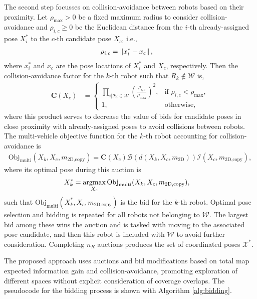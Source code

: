 The second step focusses on collision-avoidance between robots based on their proximity. Let $\rho_\text{max}>0$ be a fixed maximum radius to consider collision-avoidance and $\rho_{i,c}\geq0$ be the Euclidean distance from the $i$-th already-assigned pose $X^*_i$ to the $c$-th candidate pose $X_c$, i.e.,
\begin{align}
\rho_{i,c}&=\left\| x^*_i-x_c \right\|,
\end{align}
where $x^*_i$ and $x_c$ are the pose locations of $X^*_i$ and $X_c$, respectively. Then the collision-avoidance factor for the $k$-th robot such that $R_k\notin\mathcal W$ is,
\begin{align}
\label{eqn:CollisionAvoidanceAmongRobots}
\mathbf C(X_c)&=
\begin{cases}
    \prod_{i|\mathcal{R}_i\in\mathcal W} \left(\frac{\rho_{i,c}}{\rho_\text{max}}\right)^2,		& \text{if }\rho_{i,c}<\rho_\text{max},\\
    1,              				& \text{otherwise},
\end{cases}
\end{align}
where this product serves to decrease the value of bids for candidate poses in close proximity with already-assigned poses to avoid collisions between robots. The multi-vehicle objective function for the $k$-th robot accounting for collision-avoidance is
\begin{align}
\label{eqn:CandidateBidMulti}
\text{Obj}_\text{multi}(X_k,X_c,m_\text{2D,copy})
=\mathbf C(X_c)\mathcal B(d(X_k,X_c,m_\text{2D}))\mathcal I(X_{c},m_\text{2D,copy}),
\end{align}
where its optimal pose during this auction is
\begin{align}
\label{eqn:OptPoseMulti}
X^*_{k}=\argmax_{X_c}\text{Obj}_\text{multi}&(X_k,X_c,m_\text{2D,copy}),
\end{align}
such that $\text{Obj}_\text{multi}(X^*_k,X_c,m_\text{2D,copy})$ is the bid for the $k$-th robot.
Optimal pose selection and bidding is repeated for all robots not belonging to $\mathcal W$. The largest bid among these wins the auction and is tasked with moving to the associated pose candidate, and then this robot is included with $\mathcal W$ to avoid further consideration. Completing $n_R$ auctions produces the set of coordinated poses $\mathcal X^*$.

The proposed approach uses auctions and bid modifications based on total map expected information gain and collision-avoidance, promoting exploration of different spaces without explicit consideration of coverage overlaps. The pseudocode for the bidding process is shown with Algorithm \ref{alg:bidding}.

